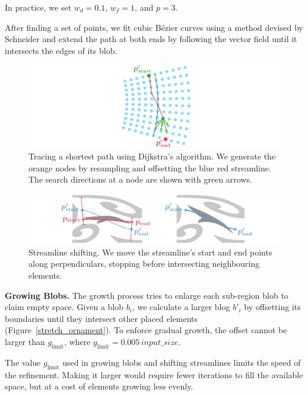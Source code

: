 In practice, we set $w_d = 0.1$, $w_f=1$, and $p = 3$.

After finding a set of points, we fit cubic B\'ezier curves using a method
devised by Schneider \cite{Schneider1990} and extend the path at both ends 
by following
the vector field until it intersects the edges of its blob. 

\begin{figure}
\includegraphics[width=1.0\textwidth]{figures/flowpak/dijkstra.pdf}
 \caption[Trace a shortest path]
 {\label{dijkstra}
 Tracing a shortest path using Dijkstra's algorithm.  We generate the 
 orange nodes by resampling and offsetting the blue red streamline.
          The search directions at a node are shown with green arrows.}
\end{figure}

\begin{figure}
 \includegraphics[width=1.0\textwidth]{figures/flowpak/shift_streamline.pdf}
 \caption[Shift a streamline]
 {\label{shift_streamline}
 Streamline shifting.
  We move the streamline's start and end points along 
  perpendiculars, stopping before intersecting neighbouring elements.}
\end{figure}

\textbf{Growing Blobs.} The growth process tries to enlarge each sub-region blob to
claim empty space.
Given a blob $b_{i}$, we calculate a larger blog $b'_{i}$ 
by offsetting its boundaries until they intersect other placed elements (Figure~\ref{stretch_ornament}).
To enforce gradual growth, the offset cannot be larger than $g_\mathrm{limit}$, where
$g_\mathrm{limit}=0.005\,input\_size$.

The value $g_\mathrm{limit}$ used in growing blobs and shifting streamlines limits the speed of
the refinement.  Making it larger would require fewer iterations to fill the available space,
but at a cost of elements growing less evenly. 

